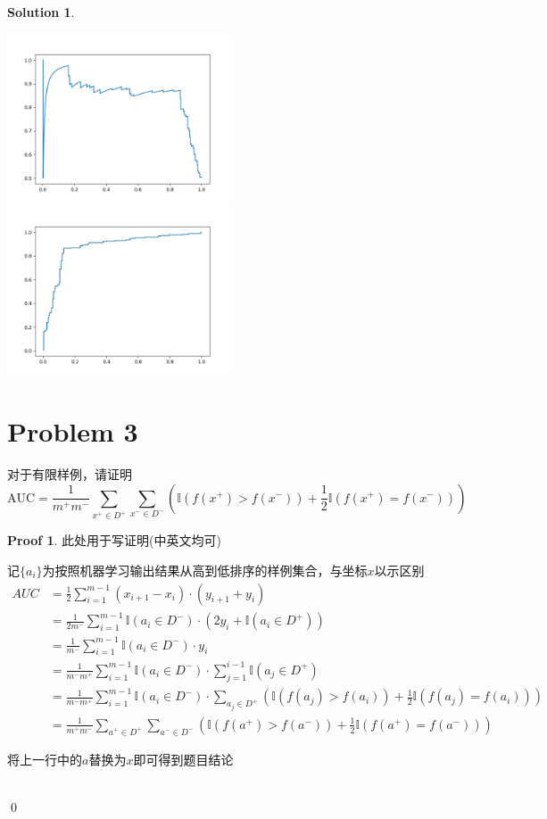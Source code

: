 \documentclass[a4paper,UTF8]{article}
\theoremstyle{definition}
\newtheorem*{solution}{Solution}
\newtheorem*{prove}{Proof}
\begin{document}
\begin{solution}
\begin{tcolorbox}
	\includegraphics[width=0.5\textwidth]{Pr2_pr.png}
	\includegraphics[width=0.5\textwidth]{Pr2_roc.png}
\end{tcolorbox}
\end{solution}

\section*{Problem 3}
对于有限样例，请证明
\[
\text{AUC} = \frac{1}{m^+m^-}\sum_{x^+\in D^+}\sum_{x^-\in D^-}\left(\mathbb{I}(f(x^+)>f(x^-))+\frac{1}{2}\mathbb{I}(f(x^+)=f(x^-))\right)
\]

\begin{prove}
此处用于写证明(中英文均可)
~\\
\begin{tcolorbox}
	\centering
		记$\{a_i\}$为按照机器学习输出结果从高到低排序的样例集合，与坐标$x$以示区别
	\begin{equation*}
		\begin{split}
			AUC &= \frac{1}{2} \sum \limits_{i=1}^{m-1} (x_{i+1}-x_i) \cdot (y_{i+1}+y_i)\\
				&= \frac{1}{2m^-} \sum \limits_{i=1}^{m-1} \mathbb{I} (a_i \in D^-) \cdot (2y_i+\mathbb{I}(a_i \in D^+))\\
				&= \frac{1}{m^-} \sum \limits_{i=1}^{m-1} \mathbb{I} (a_i \in D^-) \cdot y_i\\
				&= \frac{1}{m^-m^+} \sum \limits_{i=1}^{m-1} \mathbb{I} (a_i \in D^-) \cdot \sum \limits_{j=1}^{i-1} \mathbb{I}(a_j \in D^+)\\
				&= \frac{1}{m^-m^+} \sum \limits_{i=1}^{m-1} \mathbb{I} (a_i \in D^-) \cdot \sum \limits_{a_j \in D^+} \left(\mathbb{I}(f(a_j)>f(a_i))+\frac{1}{2}\mathbb{I}(f(a_j)=f(a_i)) \right) \\
				&= \frac{1}{m^+m^-}\sum_{a^+\in D^+}\sum_{a^-\in D^-}\left(\mathbb{I}(f(a^+)>f(a^-))+\frac{1}{2}\mathbb{I}(f(a^+)=f(a^-))\right)
		\end{split}
	\end{equation*}

	将上一行中的$a$替换为$x$即可得到题目结论
\end{tcolorbox}
~\\
\qed
\end{prove}
\end{document}
